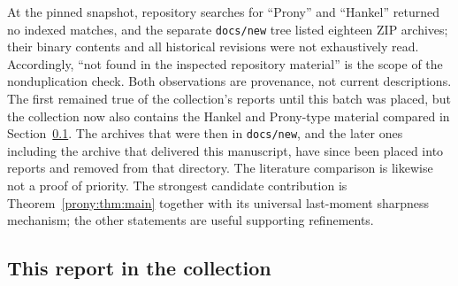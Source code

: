 \documentclass[11pt,letterpaper]{article}
\theoremstyle{definition}
\theoremstyle{remark}
\newcommand{\lbl}[1]{\nolinkurl{#1}}%
\begin{document}
At the pinned snapshot, repository searches for ``Prony'' and ``Hankel''
returned no indexed matches, and the separate \lbl{docs/new} tree listed
eighteen ZIP archives; their
binary contents and all historical revisions were not exhaustively read.
Accordingly, ``not found in the inspected repository material'' is the
scope of the nonduplication check. Both observations are provenance, not
current descriptions. The first remained true of the collection's reports
until this batch was placed, but the collection now also contains the
Hankel and Prony-type material compared in
Section~\ref{prony:subsec:collection}. The archives that were then in
\lbl{docs/new}, and the later ones including the archive that delivered this
manuscript, have since been placed into reports and removed from that
directory. The literature comparison is likewise
not a proof of priority. The strongest candidate contribution is
Theorem~\ref{prony:thm:main} together with its universal last-moment sharpness
mechanism; the other statements are useful supporting refinements.

\subsection{This report in the collection}
\label{prony:subsec:collection}
\end{document}
